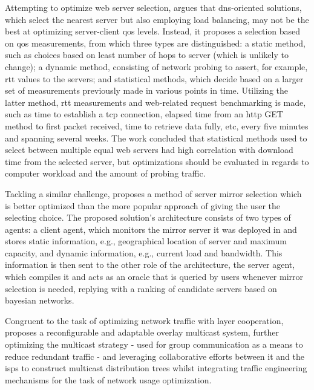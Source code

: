     Attempting to optimize web server selection, \cite{kenichi} argues that \gls{dns}-oriented solutions, which select the nearest server but also employing load balancing, may not be the best at optimizing server-client \gls{qos} levels.
    Instead, it proposes a selection based on \gls{qos} measurements, from which three types are distinguished: a static method, such as choices based on least number of hops to server (which is unlikely to change); a dynamic method, consisting of network probing to assert, for example, \gls{rtt} values to the servers; and statistical methods, which decide based on a larger set of measurements previously made in various points in time.
    Utilizing the latter method, \gls{rtt} measurements and web-related request benchmarking is made, such as time to establish a \gls{tcp} connection, elapsed time from an \gls{http} GET method to first packet received, time to retrieve data fully, etc, every five minutes and spanning several weeks.
    The work concluded that statistical methods used to select between multiple equal web servers had high correlation with download time from the selected server, but optimizations should be evaluated in regards to computer workload and the amount of probing traffic.

    Tackling a similar challenge, \cite{swain} proposes a method of server mirror selection which is better optimized than the more popular approach of giving the user the selecting choice.
    The proposed solution's architecture consists of two types of agents: a client agent, which monitors the mirror server it was deployed in and stores static information, e.g., geographical location of server and maximum capacity, and dynamic information, e.g., current load and bandwidth.
    This information is then sent to the other role of the architecture, the server agent, which compiles it and acts as an oracle that is queried by users whenever mirror selection is needed, replying with a ranking of candidate servers based on bayesian networks.

    Congruent to the task of optimizing network traffic with layer cooperation, \cite{adaptable-overlay} proposes a reconfigurable and adaptable overlay multicast system, further optimizing the multicast strategy - used for group communication as a means to reduce redundant traffic - and leveraging collaborative efforts between it and the \glspl{isp} to construct multicast distribution trees whilst integrating traffic engineering mechanisms for the task of network usage optimization.

